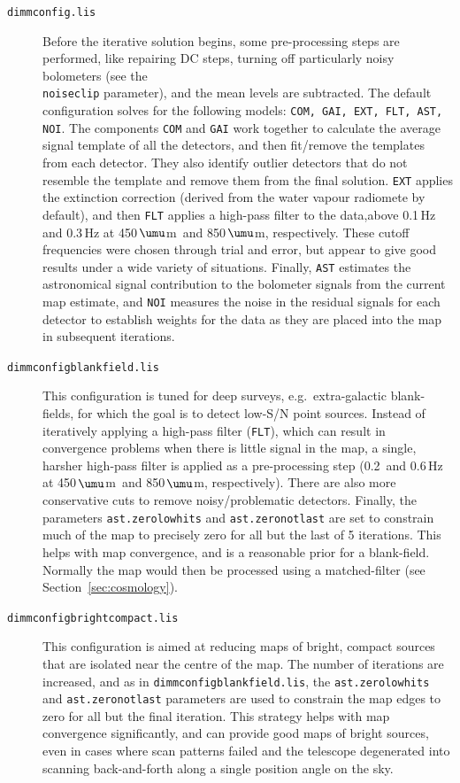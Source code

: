 \documentclass[twoside,11pt]{article}
\newcommand{\micron}{\mbox{\,${\umu}$m}}            %
\renewcommand{\_}{\texttt{\symbol{95}}}
\begin{document}
\begin{description}

\item[\texttt{dimmconfig.lis}]\quad Before the iterative solution
  begins, some pre-processing steps are performed, like repairing DC
  steps, turning off particularly noisy bolometers (see the
  \\ \texttt{noiseclip} parameter), and the mean levels are
  subtracted.  The default configuration solves for the following
  models: \texttt{COM, GAI, EXT, FLT, AST, NOI}. The components
  \texttt{COM} and \texttt{GAI} work together to calculate the average
  signal template of all the detectors, and then fit/remove the
  templates from each detector. They also identify outlier detectors
  that do not resemble the template and remove them from the final
  solution. \texttt{EXT} applies the extinction correction (derived
  from the water vapour radiomete by default), and then \texttt{FLT}
  applies a high-pass filter to the data,above 0.1\,Hz and 0.3\,Hz at
  450\micron\ and 850\micron, respectively. These cutoff
  frequencies were chosen through trial and error, but appear to give
  good results under a wide variety of situations. Finally,
  \texttt{AST} estimates the astronomical signal contribution to the
  bolometer signals from the current map estimate, and \texttt{NOI}
  measures the noise in the residual signals for each detector to
  establish weights for the data as they are placed into the map in
  subsequent iterations.

\item[\texttt{dimmconfig\_blank\_field.lis}]\quad This configuration
  is tuned for deep surveys, e.g.~extra-galactic blank-fields, for
  which the goal is to detect low-S/N point sources. Instead of
  iteratively applying a high-pass filter (\texttt{FLT}), which can
  result in convergence problems when there is little signal in the
  map, a single, harsher high-pass filter is applied as a
  pre-processing step (0.2\, and 0.6\,Hz at 450\micron\ and
  850\micron, respectively). There are also more conservative cuts
  to remove noisy/problematic detectors. Finally, the parameters
  \texttt{ast.zero\_lowhits} and \texttt{ast.zero\_notlast} are set to
  constrain much of the map to precisely zero for all but the last of
  5 iterations. This helps with map convergence, and is a reasonable
  prior for a blank-field. Normally the map would then be processed
  using a matched-filter (see Section~\ref{sec:cosmology}).

\item[\texttt{dimmconfig\_bright\_compact.lis}]\quad This
  configuration is aimed at reducing maps of bright, compact sources
  that are isolated near the centre of the map. The number of
  iterations are increased, and as in
  \texttt{dimmconfig\_blank\_field.lis}, the
  \texttt{ast.zero\_lowhits} and \texttt{ast.zero\_notlast} parameters
  are used to constrain the map edges to zero for all but the final
  iteration. This strategy helps with map convergence significantly,
  and can provide good maps of bright sources, even in cases where
  scan patterns failed and the telescope degenerated into scanning
  back-and-forth along a single position angle on the sky.


\end{description}
\end{document}
